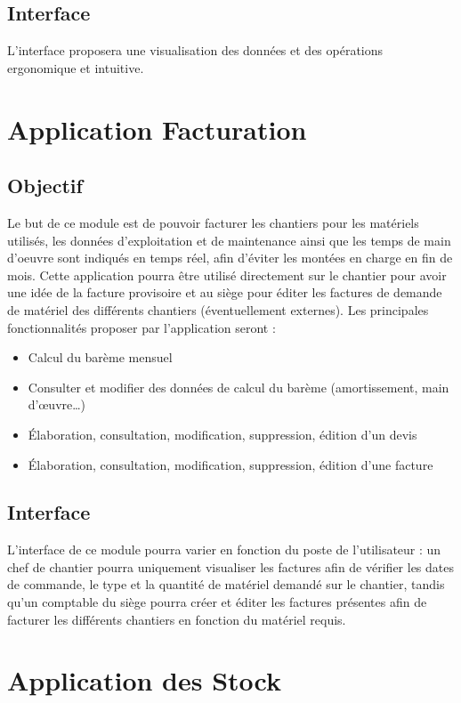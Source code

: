 	\subsection{Interface}
	L'interface proposera une visualisation des données et des opérations ergonomique et intuitive.

\section {Application Facturation}

	\subsection {Objectif}
	Le but de ce module est de pouvoir facturer les chantiers pour les matériels utilisés, les données d'exploitation et de maintenance ainsi que les temps de main d'oeuvre sont indiqués en temps réel, afin d'éviter les montées en charge en fin de mois. Cette application pourra être utilisé directement sur le chantier pour avoir une idée de la facture provisoire et au siège pour éditer les factures de demande de matériel des différents chantiers (éventuellement externes). Les principales fonctionnalités proposer par l'application seront :

       \begin{itemize}
	    \item Calcul du barème mensuel
	    \item Consulter et modifier des données de calcul du barème (amortissement, main d'œuvre…)
	    \item Élaboration, consultation, modification, suppression, édition d'un devis
	    \item Élaboration, consultation, modification, suppression, édition d'une facture
       \end{itemize}

	\subsection {Interface}
	L'interface de ce module pourra varier en fonction du poste de l'utilisateur : un chef de chantier pourra uniquement visualiser les factures afin de vérifier les dates de commande, le type et la quantité de matériel demandé sur le chantier, tandis qu'un comptable du siège pourra créer et éditer les factures présentes afin de facturer les différents chantiers en fonction du matériel requis.

\section{Application des Stock}
